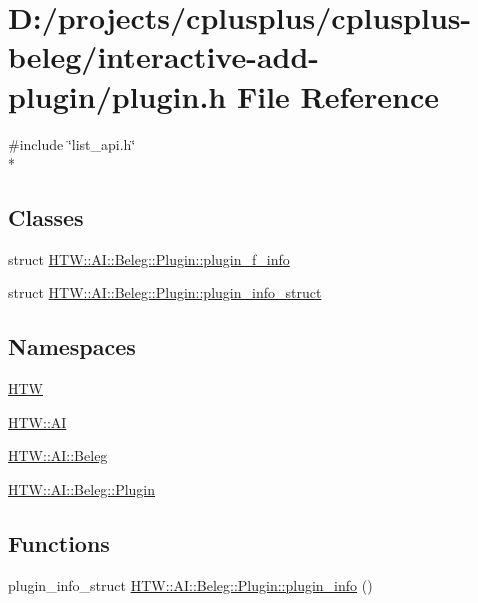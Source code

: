 \hypertarget{interactive-add-plugin_2plugin_8h}{\section{D\-:/projects/cplusplus/cplusplus-\/beleg/interactive-\/add-\/plugin/plugin.h File Reference}
\label{interactive-add-plugin_2plugin_8h}
}
{\ttfamily \#include \char`\"{}list\-\_\-api.\-h\char`\"{}}\\*
\subsection*{Classes}
\begin{DoxyCompactItemize}
\item 
struct \hyperlink{struct_h_t_w_1_1_a_i_1_1_beleg_1_1_plugin_1_1plugin__f__info}{H\-T\-W\-::\-A\-I\-::\-Beleg\-::\-Plugin\-::plugin\-\_\-f\-\_\-info}
\item 
struct \hyperlink{struct_h_t_w_1_1_a_i_1_1_beleg_1_1_plugin_1_1plugin__info__struct}{H\-T\-W\-::\-A\-I\-::\-Beleg\-::\-Plugin\-::plugin\-\_\-info\-\_\-struct}
\end{DoxyCompactItemize}
\subsection*{Namespaces}
\begin{DoxyCompactItemize}
\item 
\hyperlink{namespace_h_t_w}{H\-T\-W}
\item 
\hyperlink{namespace_h_t_w_1_1_a_i}{H\-T\-W\-::\-A\-I}
\item 
\hyperlink{namespace_h_t_w_1_1_a_i_1_1_beleg}{H\-T\-W\-::\-A\-I\-::\-Beleg}
\item 
\hyperlink{namespace_h_t_w_1_1_a_i_1_1_beleg_1_1_plugin}{H\-T\-W\-::\-A\-I\-::\-Beleg\-::\-Plugin}
\end{DoxyCompactItemize}
\subsection*{Functions}
\begin{DoxyCompactItemize}
\item 
plugin\-\_\-info\-\_\-struct \hyperlink{namespace_h_t_w_1_1_a_i_1_1_beleg_1_1_plugin_a09f048dbac5b6f35fca9900b50aa9224}{H\-T\-W\-::\-A\-I\-::\-Beleg\-::\-Plugin\-::plugin\-\_\-info} ()
\end{DoxyCompactItemize}
